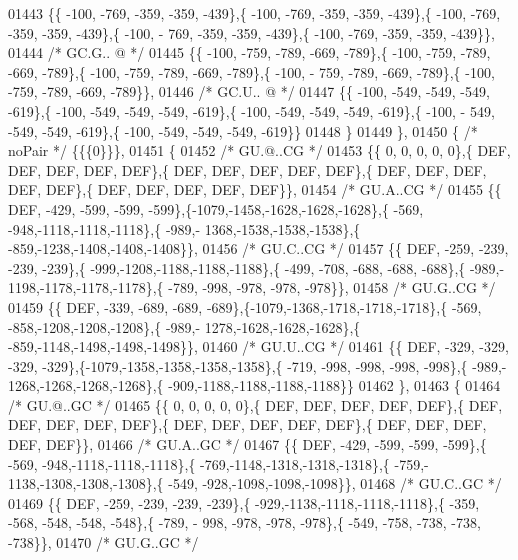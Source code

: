 \begin{DoxyCode}
01443 \{\{ -100, -769, -359, -359, -439\},\{ -100, -769, -359, -359, -439\},\{ -100, -769, -359, -359, -439\},\{ -100, -
      769, -359, -359, -439\},\{ -100, -769, -359, -359, -439\}\},
01444 \textcolor{comment}{/* GC.G.. @ */}
01445 \{\{ -100, -759, -789, -669, -789\},\{ -100, -759, -789, -669, -789\},\{ -100, -759, -789, -669, -789\},\{ -100, -
      759, -789, -669, -789\},\{ -100, -759, -789, -669, -789\}\},
01446 \textcolor{comment}{/* GC.U.. @ */}
01447 \{\{ -100, -549, -549, -549, -619\},\{ -100, -549, -549, -549, -619\},\{ -100, -549, -549, -549, -619\},\{ -100, -
      549, -549, -549, -619\},\{ -100, -549, -549, -549, -619\}\}
01448 \}
01449 \},
01450 \{ \textcolor{comment}{/* noPair */} \{\{\{0\}\}\},
01451 \{
01452 \textcolor{comment}{/* GU.@..CG */}
01453 \{\{    0,    0,    0,    0,    0\},\{  DEF,  DEF,  DEF,  DEF,  DEF\},\{  DEF,  DEF,  DEF,  DEF,  DEF\},\{  DEF,  
      DEF,  DEF,  DEF,  DEF\},\{  DEF,  DEF,  DEF,  DEF,  DEF\}\},
01454 \textcolor{comment}{/* GU.A..CG */}
01455 \{\{  DEF, -429, -599, -599, -599\},\{-1079,-1458,-1628,-1628,-1628\},\{ -569, -948,-1118,-1118,-1118\},\{ -989,-
      1368,-1538,-1538,-1538\},\{ -859,-1238,-1408,-1408,-1408\}\},
01456 \textcolor{comment}{/* GU.C..CG */}
01457 \{\{  DEF, -259, -239, -239, -239\},\{ -999,-1208,-1188,-1188,-1188\},\{ -499, -708, -688, -688, -688\},\{ -989,-
      1198,-1178,-1178,-1178\},\{ -789, -998, -978, -978, -978\}\},
01458 \textcolor{comment}{/* GU.G..CG */}
01459 \{\{  DEF, -339, -689, -689, -689\},\{-1079,-1368,-1718,-1718,-1718\},\{ -569, -858,-1208,-1208,-1208\},\{ -989,-
      1278,-1628,-1628,-1628\},\{ -859,-1148,-1498,-1498,-1498\}\},
01460 \textcolor{comment}{/* GU.U..CG */}
01461 \{\{  DEF, -329, -329, -329, -329\},\{-1079,-1358,-1358,-1358,-1358\},\{ -719, -998, -998, -998, -998\},\{ -989,-
      1268,-1268,-1268,-1268\},\{ -909,-1188,-1188,-1188,-1188\}\}
01462 \},
01463 \{
01464 \textcolor{comment}{/* GU.@..GC */}
01465 \{\{    0,    0,    0,    0,    0\},\{  DEF,  DEF,  DEF,  DEF,  DEF\},\{  DEF,  DEF,  DEF,  DEF,  DEF\},\{  DEF,  
      DEF,  DEF,  DEF,  DEF\},\{  DEF,  DEF,  DEF,  DEF,  DEF\}\},
01466 \textcolor{comment}{/* GU.A..GC */}
01467 \{\{  DEF, -429, -599, -599, -599\},\{ -569, -948,-1118,-1118,-1118\},\{ -769,-1148,-1318,-1318,-1318\},\{ -759,-
      1138,-1308,-1308,-1308\},\{ -549, -928,-1098,-1098,-1098\}\},
01468 \textcolor{comment}{/* GU.C..GC */}
01469 \{\{  DEF, -259, -239, -239, -239\},\{ -929,-1138,-1118,-1118,-1118\},\{ -359, -568, -548, -548, -548\},\{ -789, -
      998, -978, -978, -978\},\{ -549, -758, -738, -738, -738\}\},
01470 \textcolor{comment}{/* GU.G..GC */}

\end{DoxyCode}
